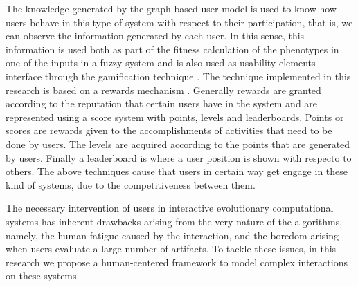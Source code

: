 \par The knowledge generated by the graph-based user model is used to know how users
behave in this type of system with respect to their participation, that is, we
can observe the information generated by each user. In this sense, this
information is used both as part of the fitness calculation of the phenotypes in
one of the inputs in a fuzzy system and is also used as usability elements
interface through the gamification technique \cite{huotari2012defining,
deterding2011game, hickman2010total, mcgonigal2011reality}. The technique
implemented in this research is based on a rewards mechanism \cite{sutter2010browse}.
Generally rewards are granted according to the reputation that certain users
have in the system and are represented using a score system with points, levels and
leaderboards. Points or scores are rewards given to the accomplishments of
activities that need to be done by users. The levels are acquired according to
the points that are generated by users. Finally a leaderboard is where a user position
is shown with respecto to others. The above
techniques cause that users in certain way get engage in these kind of
systems, due to the competitiveness between them.

\par The necessary intervention of users in interactive evolutionary computational
systems has inherent drawbacks arising from the very nature of the algorithms,
namely, the human fatigue caused by the interaction, and the boredom arising
when users evaluate a large number of artifacts. To tackle these issues, in this
research we propose a human-centered framework to model complex interactions on
these systems.

